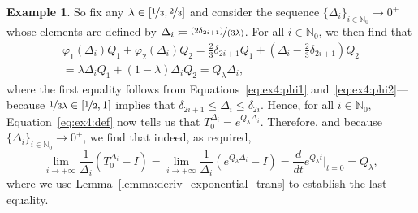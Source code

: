 \documentclass[10pt,a4paper]{paper}
\theoremstyle{definition}
\newtheorem{exmp}{Example}%
\newcommand{\nats}{\mathbb{N}}
\newcommand{\processes}{\mathbb{P}}
\newcommand{\wprocesses}{\processes^{\mathrm{W}}}
\newcommand{\coloneqq}{:\!=}
\begin{document}
\begin{exmp}
So fix any $\lambda\in[\nicefrac{1}{3},\nicefrac{2}{3}]$ and consider the sequence $\{\Delta_i\}_{i\in\nats_0}\to0^+$ whose elements are defined by $\Delta_i\coloneqq\nicefrac{(2\delta_{2i+1})}{(3\lambda)}$. For all $i\in\nats_0$, we then find that
\begin{multline*}
\varphi_1(\Delta_i)Q_1+\varphi_2(\Delta_i)Q_2
=\frac{2}{3}\delta_{2i+1}Q_1+(\Delta_i-\frac{2}{3}\delta_{2i+1})Q_2\\
=\lambda\Delta_i Q_1+(1-\lambda)\Delta_i Q_2
=Q_\lambda \Delta_i,
\end{multline*}
where the first equality follows from Equations~\eqref{eq:ex4:phi1} and~\eqref{eq:ex4:phi2}---because $\nicefrac{1}{3\lambda}\in[\nicefrac{1}{2},1]$ implies that $\delta_{2i+1}\leq\Delta_i\leq\delta_{2i}$.
Hence, for all $i\in\nats_0$, Equation~\eqref{eq:ex4:def} now tells us that $T_0^{\Delta_i}=e^{Q_\lambda\Delta_i}$.
Therefore, and because $\{\Delta_{i}\}_{i\in\nats_0}\to0^+$, we find that indeed, as required,
\begin{equation}\label{eq:exmp:well-behaved-no-deriv2}
\lim_{i\to+\infty}
\frac{1}{\Delta_i}
(T^{\Delta_i}_{0}-I)
=
\lim_{i\to+\infty}
\frac{1}{\Delta_{i}}
(e^{Q_\lambda\Delta_{i}}-I)
={\frac{d}{dt}e^{Q_\lambda t}}\big\vert_{t=0}
=Q_\lambda,
\end{equation}
where we use Lemma~\ref{lemma:deriv_exponential_trans} to establish the last equality. 

\end{exmp}
\end{document}
